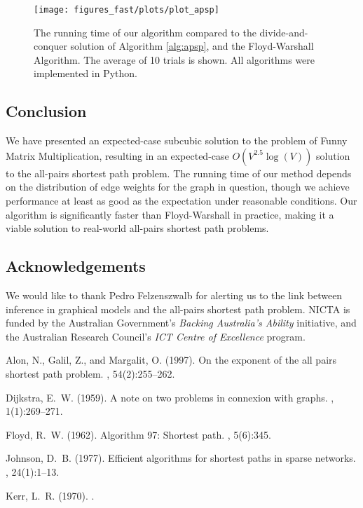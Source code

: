 \documentclass[a4paper,10pt]{article}
\begin{document}
\begin{figure*}
 \begin{center}
  \texttt{[image: figures\_fast/plots/plot\_apsp]}\end{center}
\caption{The running time of our algorithm compared to the divide-and-conquer solution of Algorithm \ref{alg:apsp}, and the Floyd-Warshall Algorithm. The average of 10 trials is shown. All algorithms were implemented in Python.}
\label{fig:compare}
\end{figure*}

\subsection{Conclusion}

We have presented an expected-case subcubic solution to the problem of Funny Matrix Multiplication, resulting in an expected-case $O(V^{2.5}\log(V))$ solution to the all-pairs shortest path problem. The running time of our method depends on the distribution of edge weights for the graph in question, though we achieve performance at least as good as the expectation under reasonable conditions. Our algorithm is significantly faster than Floyd-Warshall in practice, making it a viable solution to real-world all-pairs shortest path problems.

\subsection*{Acknowledgements}

We would like to thank Pedro Felzenszwalb for alerting us to the link between inference in graphical models and the all-pairs shortest path problem. NICTA is funded by the Australian Government's \emph{Backing Australia's Ability} initiative, and the Australian Research Council's \emph{ICT Centre of Excellence} program.

\begin{thebibliography}{}

Alon, N., Galil, Z., and Margalit, O. (1997).
\newblock On the exponent of the all pairs shortest path problem.
, 54(2):255--262.

Dijkstra, E.~W. (1959).
\newblock A note on two problems in connexion with graphs.
, 1(1):269--271.

Floyd, R.~W. (1962).
\newblock Algorithm 97: Shortest path.
, 5(6):345.

Johnson, D.~B. (1977).
\newblock Efficient algorithms for shortest paths in sparse networks.
, 24(1):1--13.

Kerr, L.~R. (1970).
.

\end{thebibliography}
\end{document}
